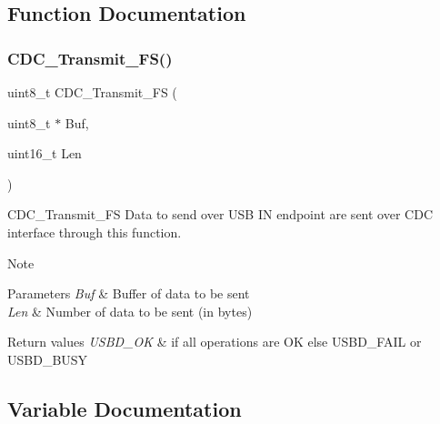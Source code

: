 \subsection{Function Documentation}
\mbox{\label{group__USBD__CDC__IF_ga5137d6201dbdef2bf351c5b4941c24f4}} 
\subsubsection{\texorpdfstring{C\+D\+C\+\_\+\+Transmit\+\_\+\+F\+S()}{CDC\_Transmit\_FS()}}
{\footnotesize\ttfamily uint8\+\_\+t C\+D\+C\+\_\+\+Transmit\+\_\+\+FS (\begin{DoxyParamCaption}\item[{uint8\+\_\+t $\ast$}]{Buf,  }\item[{uint16\+\_\+t}]{Len }\end{DoxyParamCaption})}



C\+D\+C\+\_\+\+Transmit\+\_\+\+FS Data to send over U\+SB IN endpoint are sent over C\+DC interface through this function. 

\begin{DoxyNote}{Note}

\end{DoxyNote}

\begin{DoxyParams}{Parameters}
{\em Buf} & Buffer of data to be sent \\
\hline
{\em Len} & Number of data to be sent (in bytes) \\
\hline
\end{DoxyParams}

\begin{DoxyRetVals}{Return values}
{\em U\+S\+B\+D\+\_\+\+OK} & if all operations are OK else U\+S\+B\+D\+\_\+\+F\+A\+IL or U\+S\+B\+D\+\_\+\+B\+U\+SY \\
\hline
\end{DoxyRetVals}


\subsection{Variable Documentation}
\mbox{\label{group__USBD__CDC__IF_ga99394ed19b774f171df96c2848c411ed}} 

